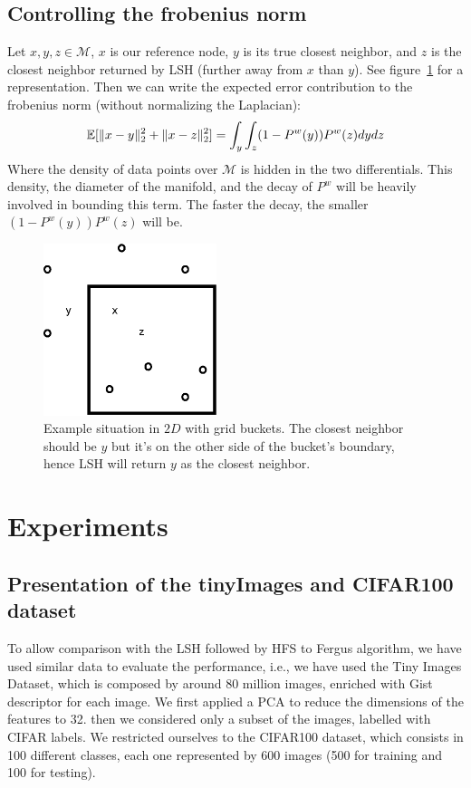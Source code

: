 \documentclass{article} %
\begin{document}
\subsection{Controlling the frobenius norm}
Let $x, y, z \in \mathcal{M}$, $x$ is our reference node, $y$ is its true closest neighbor, and $z$ is the closest neighbor returned by LSH (further away from $x$ than $y$). See figure~\ref{degeu} for a representation. Then we can write the expected error contribution to the frobenius norm (without normalizing the Laplacian):
$$\mathbb{E}[\Arrowvert x-y\Arrowvert_2^2 + \Arrowvert x-z\Arrowvert_2^2] = \int_y \int_z (1-P^w(y))P^w(z)dydz$$
Where the density of data points over $\mathcal{M}$ is hidden in the two differentials. This density, the diameter of the manifold, and the decay of $P^w$ will be heavily involved in bounding this term. The faster the decay, the smaller $(1-P^w(y))P^w(z)$ will be.
\begin{figure}[ht!]
 \centering
 \includegraphics[width=0.45\textwidth]{figures/dessin_degeu.eps} 
 \caption{Example situation in $2D$ with grid buckets. The closest neighbor should be $y$ but it's on the other side of the bucket's boundary, hence LSH will return $y$ as the closest neighbor.}
 \label{degeu}
\end{figure}

\section{Experiments}

\subsection{Presentation of the tinyImages and CIFAR100 dataset}
To allow comparison with the LSH followed by HFS to Fergus algorithm, we have used similar data to evaluate the performance, i.e., we have used the Tiny Images Dataset, which is composed by around 80 million images, enriched with Gist descriptor for each image. We first applied a PCA to reduce the dimensions of the features to 32. then we considered only a subset of the images, labelled with CIFAR labels. We restricted ourselves to the CIFAR100 dataset, which consists in 100 different classes, each one represented by 600 images (500 for training and 100 for testing).
 
\end{document}
